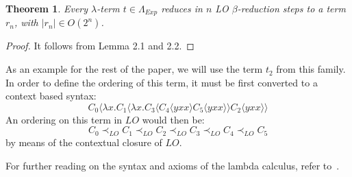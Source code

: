 \documentclass[11pt]{article}
\newtheorem{theorem}{Theorem}[section]
\begin{document}
\begin{theorem}
Every $\lambda$-term $t \in \Lambda_{Exp}$ reduces in $n$ LO $\beta$-reduction steps to a term $r_n$, with $|r_n| \in O(2^n)$.
\end{theorem}
\begin{proof}
It follows from Lemma 2.1 and 2.2.
\end{proof}

As an example for the rest of the paper, we will use the term $t_{2}$ from this family. In order to define the ordering of this term, it must be first converted to a context based syntax:
\[ C_{0} \langle \lambda x. C_{1} \langle \lambda x. C_{3} \langle C_{4} \langle yxx \rangle C_{5} \langle yxx \rangle \rangle C_{2} \langle yxx \rangle \rangle \]
An ordering on this term in $LO$ would then be:
\begin{equation}
 C_{0} \prec_{LO} C_{1} \prec_{LO} C_{2} \prec_{LO} C_{3} \prec_{LO} C_{4} \prec_{LO} C_{5}
\end{equation}
by means of the contextual closure of $LO$.

For further reading on the syntax and axioms of the lambda calculus, refer to~\cite{barendregt1984lambda}.
\end{document}
